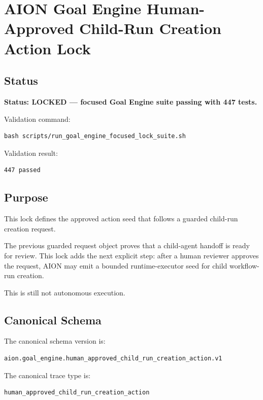 \section{AION Goal Engine Human-Approved Child-Run Creation Action Lock}
\label{sec:aion-goal-engine-human-approved-child-run-creation-action-lock}

\subsection{Status}

\textbf{Status: LOCKED --- focused Goal Engine suite passing with 447 tests.}

Validation command:

\begin{verbatim}
bash scripts/run_goal_engine_focused_lock_suite.sh
\end{verbatim}

Validation result:

\begin{verbatim}
447 passed
\end{verbatim}

\subsection{Purpose}

This lock defines the approved action seed that follows a guarded child-run creation request.

The previous guarded request object proves that a child-agent handoff is ready for review. This lock adds the next explicit step: after a human reviewer approves the request, AION may emit a bounded runtime-executor seed for child workflow-run creation.

This is still not autonomous execution.

\subsection{Canonical Schema}

The canonical schema version is:

\begin{verbatim}
aion.goal_engine.human_approved_child_run_creation_action.v1
\end{verbatim}

The canonical trace type is:

\begin{verbatim}
human_approved_child_run_creation_action
\end{verbatim}

